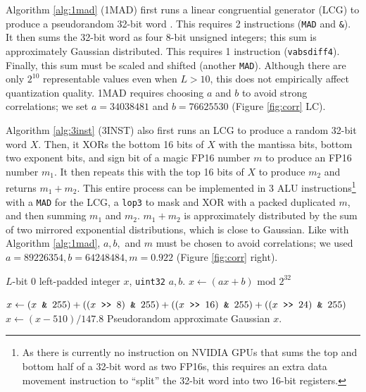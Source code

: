 Algorithm \ref{alg:1mad} (1MAD) first runs a linear congruential generator (LCG) to produce a pseudorandom 32-bit word \cite{lcg}.
This requires 2 instructions (\texttt{MAD} and \texttt{\&}). 
It then sums the 32-bit word as four 8-bit unsigned integers; this sum is approximately Gaussian distributed.
This requires 1 instruction (\texttt{vabsdiff4}).
Finally, this sum must be scaled and shifted (another \texttt{MAD}).
Although there are only $2^{10}$ representable values even when $L > 10$, this does not empirically affect quantization quality.
1MAD requires choosing $a$ and $b$ to avoid strong correlations; we set $a = 34038481$ and $b = 76625530$ (Figure \ref{fig:corr} LC).

Algorithm \ref{alg:3inst} (3INST) also first runs an LCG to produce a random 32-bit word $X$.
Then, it XORs the bottom 16 bits of $X$ with the mantissa bits, bottom two exponent bits, and sign bit of a magic FP16 number $m$ to produce an FP16 number $m_1$.
It then repeats this with the top 16 bits of $X$ to produce $m_2$ and returns $m_1 + m_2$. 
This entire process can be implemented in 3 ALU instructions\footnote{As there is currently no instruction on NVIDIA GPUs that sums the top and bottom half of a 32-bit word as two FP16s, this requires an extra data movement instruction to ``split'' the 32-bit word into two 16-bit registers.} with a \texttt{MAD} for the LCG, a \texttt{lop3} to mask and XOR with a packed duplicated $m$, and then summing $m_1$ and $m_2$.
$m_1 + m_2$ is approximately distributed by the sum of two mirrored exponential distributions, which is close to Gaussian.
Like with Algorithm \ref{alg:1mad}, $a, b,$ and $m$ must be chosen to avoid correlations; we used $a = 89226354, b = 64248484, m = 0.922$ (Figure \ref{fig:corr} right).

\begin{algorithm}[t]
\caption{Computed Gaussian Code ``1MAD''}
\begin{algorithmic}
\INPUT $L$-bit 0 left-padded integer $x$, \texttt{uint32} $a, b$.
\STATE $x \gets (ax+b) \mbox{\ mod\ } 2^{32}$ 

\STATE $x \gets (x \verb| & | 255) + ((x \verb| >> | 8) \verb| & | 255) + ((x \verb| >> | 16) \verb| & | 255) + ((x \verb| >> | 24) \verb| & | 255)$ 
\STATE $x \gets (x - 510) / 147.8$
\OUTPUT Pseudorandom approximate Gaussian $x$.
\end{algorithmic}
\label{alg:1mad}
\end{algorithm}

